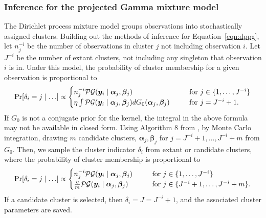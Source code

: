 \subsubsection{Inference for the projected Gamma mixture model}
The Dirichlet process mixture model groups observations into stochastically assigned clusters.  Building out the methods of inference for Equation~\ref{eqn:dppg}, let $n_j^{-i}$ be the number of observations in cluster $j$ not including observation $i$.  Let $J^{-i}$ be the number of extant 
clusters, not including any singleton that observation $i$ is in. Under this model, the probability of cluster membership for a given observation is proportional to
\begin{equation*}
    \text{Pr}\left[\delta_i = j\mid\ldots\right] \propto \begin{cases}
        n_j^{-i}\mathcal{PG}\left(\bm{y}_i\mid\bm{\alpha}_j,\bm{\beta}_j\right)\hspace{0.5cm} &\text{~for~}j \in \lbrace 1,\ldots,J^{-i}\rbrace\\
        \eta\int\mathcal{PG}\left(\bm{y}_i\mid\bm{\alpha}_j,\bm{\beta}_j\right)dG_0(\bm{\alpha}_j,\bm{\beta}_j)\hspace{0.5cm} &\text{~for~}j = J^{-i} + 1.
        \end{cases}
\end{equation*}
If $G_0$ is not a conjugate prior for the kernel, the integral in the above formula may not be
available in closed form. Using Algorithm 8 from \cite{neal2000}, by Monte Carlo integration, drawing  $m$ candidate
clusters, $\bm{\alpha}_j,\bm{\beta}_j$ for $j = J^{-i} + 1,\ldots, J^{-i} + m$ from $G_0$. 
Then, we sample the cluster indicator $\delta_i$ from extant or candidate clusters, where
the probability of cluster membership is proportional to
\begin{equation}
    \text{Pr}\left[\delta_i = j\mid\ldots\right] \propto \begin{cases}
        n_j^{-i}\mathcal{PG}\left(\bm{y}_i\mid\bm{\alpha}_j,\bm{\beta}_j\right)\hspace{0.5cm} &\text{~for~}j \in \lbrace 1,\ldots,J^{-i}\rbrace\\
        \frac{\eta}{m}\mathcal{PG}\left(\bm{y}_i\mid\bm{\alpha}_j,\bm{\beta}_j\right)\hspace{0.5cm} &\text{~for~}j \in \lbrace J^{-i} + 1,\ldots, J^{-i} + m\rbrace.
        \end{cases}
\end{equation}
If a candidate cluster is selected,
then $\delta_i = J = J^{- i} + 1$, and the associated cluster parameters are saved.

